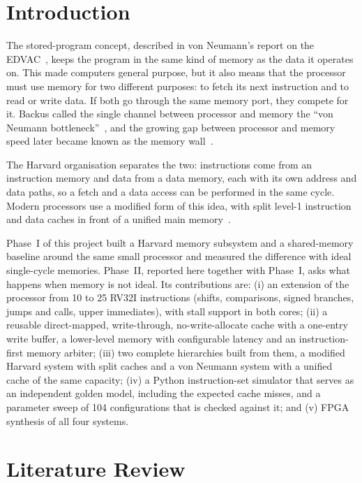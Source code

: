 \documentclass[conference]{IEEEtran}
\begin{document}
\section{Introduction}

The stored-program concept, described in von Neumann's report on the
EDVAC~\cite{vonneumann_edvac}, keeps the program in the same kind of memory
as the data it operates on. This made computers general purpose, but it also
means that the processor must use memory for two different purposes: to fetch
its next instruction and to read or write data. If both go through the same
memory port, they compete for it. Backus called the single channel between
processor and memory the ``von Neumann bottleneck''~\cite{backus1978}, and the
growing gap between processor and memory speed later became known as the
memory wall~\cite{wulf1995}.

The Harvard organisation separates the two: instructions come from an
instruction memory and data from a data memory, each with its own address and
data paths, so a fetch and a data access can be performed in the same
cycle. Modern processors use a modified form of this idea, with split level-1
instruction and data caches in front of a unified main
memory~\cite{patterson_riscv,hennessy_quant}.

Phase~I of this project built a Harvard memory subsystem and a shared-memory
baseline around the same small processor and measured the difference with
ideal single-cycle memories. Phase~II, reported here together with Phase~I,
asks what happens when memory is not ideal. Its contributions are:
(i) an extension of the processor from 10 to 25 RV32I instructions
(shifts, comparisons, signed branches, jumps and calls, upper immediates),
with stall support in both cores;
(ii) a reusable direct-mapped, write-through, no-write-allocate cache with
a one-entry write buffer, a lower-level memory with configurable latency
and an instruction-first memory arbiter;
(iii) two complete hierarchies built from them, a modified Harvard system
with split caches and a von Neumann system with a unified cache of the same
capacity;
(iv) a Python instruction-set simulator that serves as an independent golden
model, including the expected cache misses, and a parameter sweep of 104
configurations that is checked against it; and
(v) FPGA synthesis of all four systems.

\section{Literature Review}
\end{document}
